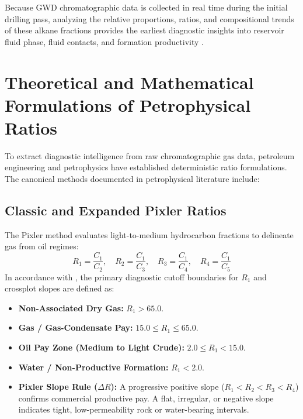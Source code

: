 Because GWD chromatographic data is collected in real time during the initial drilling pass, analyzing the relative proportions, ratios, and compositional trends of these alkane fractions provides the earliest diagnostic insights into reservoir fluid phase, fluid contacts, and formation productivity \citep{haworth1985, ref12}.

\section{Theoretical and Mathematical Formulations of Petrophysical Ratios}

To extract diagnostic intelligence from raw chromatographic gas data, petroleum engineering and petrophysics have established deterministic ratio formulations. The canonical methods documented in petrophysical literature include:

\subsection{Classic and Expanded Pixler Ratios \citep{ref13}}
The Pixler method evaluates light-to-medium hydrocarbon fractions to delineate gas from oil regimes:
\begin{equation}
    R_1 = \frac{C_1}{C_2}, \quad R_2 = \frac{C_1}{C_3}, \quad R_3 = \frac{C_1}{C_4}, \quad R_4 = \frac{C_1}{C_5}
\end{equation}
In accordance with \citet{ref13}, the primary diagnostic cutoff boundaries for $R_1$ and crossplot slopes are defined as:
\begin{itemize}
    \item \textbf{Non-Associated Dry Gas:} $R_1 > 65.0$.
    \item \textbf{Gas / Gas-Condensate Pay:} $15.0 \le R_1 \le 65.0$.
    \item \textbf{Oil Pay Zone (Medium to Light Crude):} $2.0 \le R_1 < 15.0$.
    \item \textbf{Water / Non-Productive Formation:} $R_1 < 2.0$.
    \item \textbf{Pixler Slope Rule ($\Delta R$):} A progressive positive slope ($R_1 < R_2 < R_3 < R_4$) confirms commercial productive pay. A flat, irregular, or negative slope indicates tight, low-permeability rock or water-bearing intervals.
\end{itemize}

